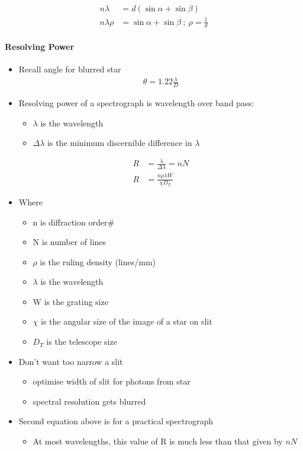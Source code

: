 \documentclass[a4paper,11pt,normalem]{article}
\begin{document}
\begin{align*}
    n\lambda &= d(\sin\alpha + \sin\beta) \\
    n\lambda\rho &= \sin\alpha + \sin\beta ~;~ \rho = \frac{1}{d}
\end{align*}

\paragraph{Resolving Power}
\begin{itemize}
    \item Recall angle for blurred star
        \begin{align*}
            \theta = 1.22\frac{\lambda}{D}
        \end{align*}
    \item Resolving power of a spectrograph is wavelength over band pass:
        \begin{itemize}
            \item \(\lambda\) is the wavelength
            \item \(\Delta\lambda\) is the minimum discernible difference in \(\lambda\)
        \end{itemize}
        \begin{align*}
            R &= \frac{\lambda}{\Delta\lambda} = nN \\
            R &= \frac{n\rho\lambda W}{\chi D_{T}}
        \end{align*}
    \item Where
        \begin{itemize}
            \item n is diffraction order\#
            \item N is number of lines
            \item \(\rho\) is the ruling density (lines/mm)
            \item \(\lambda\) is the wavelength
            \item W is the grating size
            \item \(\chi\) is the angular size of the image of a star on slit
            \item \(D_{T}\) is the telescope size
        \end{itemize}
    \item Don't want too narrow a slit
        \begin{itemize}
            \item optimise width of slit for photons from star
            \item spectral resolution gets blurred
        \end{itemize}
    \item Second equation above is for a practical spectrograph
        \begin{itemize}
            \item At most wavelengths, this value of R is much less than that given by \(nN\)
        \end{itemize}
\end{itemize}
\end{document}
